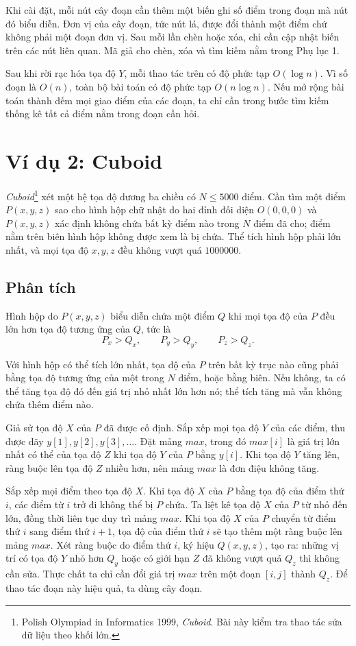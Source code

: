 \documentclass[11pt]{article}
\begin{document}
Khi cài đặt, mỗi nút cây đoạn cần thêm một biến ghi số điểm trong đoạn mà nút
đó biểu diễn. Đơn vị của cây đoạn, tức nút lá, được đổi thành một điểm chứ
không phải một đoạn đơn vị. Sau mỗi lần chèn hoặc xóa, chỉ cần cập nhật biến
trên các nút liên quan. Mã giả cho chèn, xóa và tìm kiếm nằm trong Phụ lục 1.

Sau khi rời rạc hóa tọa độ $Y$, mỗi thao tác trên có độ phức tạp
$O(\log n)$. Vì số đoạn là $O(n)$, toàn bộ bài toán có độ phức tạp
$O(n\log n)$. Nếu mở rộng bài toán thành đếm mọi giao điểm của các đoạn, ta
chỉ cần trong bước tìm kiếm thống kê tất cả điểm nằm trong đoạn cần hỏi.

\section{Ví dụ 2: Cuboid}

\emph{Cuboid}\footnote{Polish Olympiad in Informatics 1999, \emph{Cuboid}.
Bài này kiểm tra thao tác sửa dữ liệu theo khối lớn.} xét một hệ tọa độ
dương ba chiều có $N\le 5000$ điểm. Cần tìm một điểm $P(x,y,z)$ sao cho hình
hộp chữ nhật do hai đỉnh đối diện $O(0,0,0)$ và $P(x,y,z)$ xác định không
chứa bất kỳ điểm nào trong $N$ điểm đã cho; điểm nằm trên biên hình hộp không
được xem là bị chứa. Thể tích hình hộp phải lớn nhất, và mọi tọa độ
$x,y,z$ đều không vượt quá $1000000$.

\subsection*{Phân tích}

Hình hộp do $P(x,y,z)$ biểu diễn chứa một điểm $Q$ khi mọi tọa độ của $P$ đều
lớn hơn tọa độ tương ứng của $Q$, tức là
\[
  P_x>Q_x,\qquad P_y>Q_y,\qquad P_z>Q_z.
\]

Với hình hộp có thể tích lớn nhất, tọa độ của $P$ trên bất kỳ trục nào cũng
phải bằng tọa độ tương ứng của một trong $N$ điểm, hoặc bằng biên. Nếu không,
ta có thể tăng tọa độ đó đến giá trị nhỏ nhất lớn hơn nó; thể tích tăng mà
vẫn không chứa thêm điểm nào.

Giả sử tọa độ $X$ của $P$ đã được cố định. Sắp xếp mọi tọa độ $Y$ của các
điểm, thu được dãy $y[1],y[2],y[3],\ldots$. Đặt mảng $\mathit{max}$, trong đó
$\mathit{max}[i]$ là giá trị lớn nhất có thể của tọa độ $Z$ khi tọa độ $Y$ của
$P$ bằng $y[i]$. Khi tọa độ $Y$ tăng lên, ràng buộc lên tọa độ $Z$ nhiều hơn,
nên mảng $\mathit{max}$ là đơn điệu không tăng.

Sắp xếp mọi điểm theo tọa độ $X$. Khi tọa độ $X$ của $P$ bằng tọa độ của điểm
thứ $i$, các điểm từ $i$ trở đi không thể bị $P$ chứa. Ta liệt kê tọa độ $X$
của $P$ từ nhỏ đến lớn, đồng thời liên tục duy trì mảng $\mathit{max}$. Khi
tọa độ $X$ của $P$ chuyển từ điểm thứ $i$ sang điểm thứ $i+1$, tọa độ của
điểm thứ $i$ sẽ tạo thêm một ràng buộc lên mảng $\mathit{max}$. Xét ràng buộc
do điểm thứ $i$, ký hiệu $Q(x,y,z)$, tạo ra: những vị trí có tọa độ $Y$ nhỏ
hơn $Q_y$ hoặc có giới hạn $Z$ đã không vượt quá $Q_z$ thì không cần sửa.
Thực chất ta chỉ cần đổi giá trị $\mathit{max}$ trên một đoạn $[i,j]$ thành
$Q_z$. Để thao tác đoạn này hiệu quả, ta dùng cây đoạn.
\end{document}
